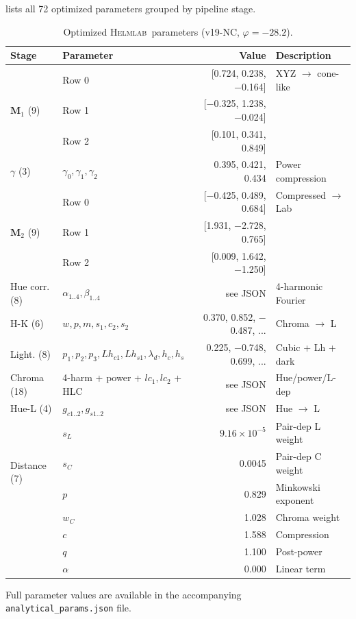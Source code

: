 \documentclass[11pt, twocolumn]{article}
\newcommand{\helmlab}{\textsc{Helmlab}}
\begin{document}
 lists all 72 optimized parameters grouped by
pipeline stage.

\begin{table}[t]
  \centering
  \caption{Optimized \helmlab\ parameters (v19-NC, $\varphi = -28.2$\textdegree).}
  \label{tab:params}
  \footnotesize
  \begin{tabular}{llrl}
    \toprule
    Stage & Parameter & Value & Description \\
    \midrule
    \multirow{3}{*}{$\mathbf{M}_1$ (9)} & Row 0 & [0.724, 0.238, $-$0.164] & XYZ $\to$ cone-like \\
    & Row 1 & [$-$0.325, 1.238, $-$0.024] & \\
    & Row 2 & [0.101, 0.341, 0.849] & \\
    \midrule
    $\gamma$ (3) & $\gamma_0, \gamma_1, \gamma_2$ & 0.395, 0.421, 0.434 & Power compression \\
    \midrule
    \multirow{3}{*}{$\mathbf{M}_2$ (9)} & Row 0 & [$-$0.425, 0.489, 0.684] & Compressed $\to$ Lab \\
    & Row 1 & [1.931, $-$2.728, 0.765] & \\
    & Row 2 & [0.009, 1.642, $-$1.250] & \\
    \midrule
    Hue corr. (8) & $\alpha_{1..4}, \beta_{1..4}$ & see JSON & 4-harmonic Fourier \\
    \midrule
    H-K (6) & $w, p, m, s_1, c_2, s_2$ & 0.370, 0.852, $-$0.487, ... & Chroma $\to$ L \\
    \midrule
    Light. (8) & $p_1, p_2, p_3, Lh_{c1}, Lh_{s1}, \lambda_d, h_c, h_s$ & 0.225, $-$0.748, 0.699, ... & Cubic + Lh + dark \\
    \midrule
    Chroma (18) & 4-harm + power + $lc_1, lc_2$ + HLC & see JSON & Hue/power/L-dep \\
    \midrule
    Hue-L (4) & $g_{c1..2}, g_{s1..2}$ & see JSON & Hue $\to$ L \\
    \midrule
    \multirow{4}{*}{Distance (7)} & $s_L$ & $9.16 \times 10^{-5}$ & Pair-dep L weight \\
    & $s_C$ & 0.0045 & Pair-dep C weight \\
    & $p$ & 0.829 & Minkowski exponent \\
    & $w_C$ & 1.028 & Chroma weight \\
    & $c$ & 1.588 & Compression \\
    & $q$ & 1.100 & Post-power \\
    & $\alpha$ & 0.000 & Linear term \\
    \bottomrule
  \end{tabular}
\end{table}

Full parameter values are available in the accompanying
\texttt{analytical\_params.json} file.
\end{document}
